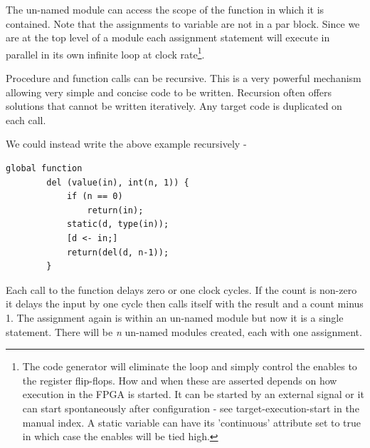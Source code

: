         The un-named module can access the scope of the function in which it is
        contained. Note that the assignments to variable  are not in a par
        block. Since we are at the top level of a module each assignment statement will
        execute in parallel in its own infinite loop at clock rate\footnote{The code
        generator will eliminate the loop and simply control the enables to the
        register flip-flops. How and when these are asserted depends on how execution
        in the FPGA is started. It can be started by an external signal or it can start
        spontaneously after configuration - see target-execution-start in the manual
        index. A static variable can have its 'continuous' attribute set to true in
        which case the enables will be tied high.}.

        Procedure and function calls can be recursive. This is a very powerful
        mechanism allowing very simple and concise code to be written. Recursion
        often offers solutions that cannot be written iteratively. Any target code
        is duplicated on each call.

        We could instead write the above example recursively -    
        \begin{lstlisting}[language=threepl]
        global function
        del (value(in), int(n, 1)) {
            if (n == 0)
                return(in);
            static(d, type(in));
            [d <- in;]
            return(del(d, n-1));
        }
        \end{lstlisting}
        Each call to the function delays zero or one clock cycles. If the count
        is non-zero it delays the input by one cycle then calls itself with the
        result and a count minus 1. The assignment again is within an un-named
        module but now it is a single statement. There will be {\em n}
        un-named modules created, each with one assignment.

